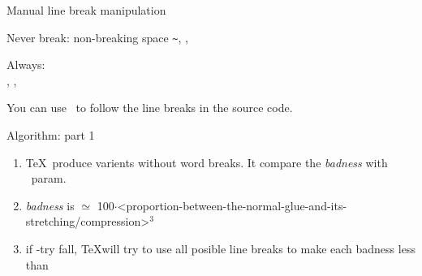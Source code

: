 \begin{frame}{Manual line break manipulation\magicPage}\relax

Never break: non-breaking space \verb|~|, \ccol\nobreak, \ccol\nolinebreak

Always: \ccol\\, \ccol\break, \ccol\linebreak

You can use \ccol\obeylines\ to follow the line breaks in the source code.
     
\end{frame}

\begin{frame}{Algorithm: part 1\magicPage}\relax

\begin{enumerate}
    \item \TeX\ produce varients without word breaks. It compare the \textit{badness} with \ccol\pretolerance\ param. 
    \item \textit{badness} is $\simeq$ 100$\cdot$<proportion-between-the-normal-glue-and-its-stretching/compression>$^3$
    \item if \ccol\pretolerance-try fall, \TeX will try to use all posible line breaks to make each badness less than \ccol\tolerance
     
\end{enumerate}
     
\end{frame}

